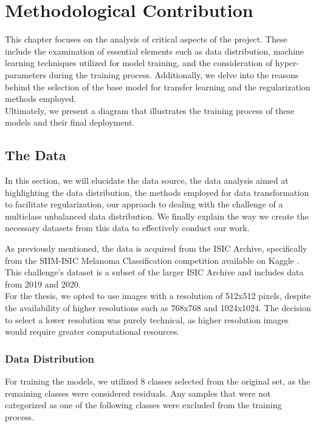 \chapter{Methodological Contribution} \label{cap:contrib}


This chapter focuses on the analysis of critical aspects of the project. These
include the examination of essential elements such as data distribution,
machine learning techniques utilized for model training, and the consideration
of hyper-parameters during the training process. Additionally, we delve into
the reasons behind the selection of the base model for transfer learning and
the regularization methods employed. \\

Ultimately, we present a diagram that illustrates the training process of these
models and their final deployment.

\section{The Data}

In this section, we will elucidate the data source, the data analysis aimed at
highlighting the data distribution, the methods employed for data
transformation to facilitate regularization, our approach to dealing with the
challenge of a multiclass unbalanced data distribution. We finally explain the
way we create the necessary datasets from this data to effectively conduct our
work.

As previously mentioned, the data is acquired from the ISIC Archive,
specifically from the SIIM-ISIC Melanoma Classification competition available
on Kaggle \cite{ISICKaggle}. This challenge's dataset is a subset of the larger
ISIC Archive and includes data from 2019 and 2020. \\

For the thesis, we opted to use images with a resolution of 512x512 pixels,
despite the availability of higher resolutions such as 768x768 and 1024x1024.
The decision to select a lower resolution was purely technical, as higher
resolution images would require greater computational resources. \\

\subsection{Data Distribution}

For training the models, we utilized 8 classes selected from the original set,
as the remaining classes were considered residuals. Any samples that were not
categorized as one of the following classes were excluded from the training
process.


